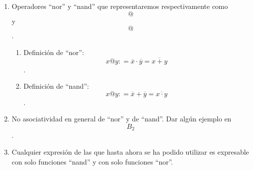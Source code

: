 \documentclass[
]{article}
\providecommand{\tightlist}{%
  \setlength{\itemsep}{0pt}\setlength{\parskip}{0pt}}
\begin{document}
\begin{enumerate}
\begin{enumerate}
\begin{enumerate}
\begin{enumerate}
\begin{enumerate}
          \emph{\textbf{a.5.HI.tts+tts*)}} La expresión sería una del
          tipo
          \[{T_{1} \cdot \mathit{TS}_{2}} = {T_{2} \cdot \mathit{TS}_{3}}\]
          ,
          \[{\left( {T_{1}{' + \mathit{TS}_{0}}} \right) + \mathit{TS}_{2}} = {\left( {T_{2}{' + \mathit{TS}_{1}}} \right) \cdot \mathit{TS}_{3}}\],
          dónde para \[T'\] suponemos (HI), que los valores de verdad de
          \[T_{1}{{' + \mathit{TS}_{2}} = T_{2}}{' + \mathit{TS}_{3}}\]
          son idénticos a los de
          \[\widetilde{T_{1}}{{' \cdot \widetilde{\mathit{TS}_{2}}} = \widetilde{T_{2}}}{' \cdot \widetilde{\mathit{TS}_{3}}}\]
          y viceversa. Ahora bien \[\mathit{TS}_{0} + \mathit{TS}_{2}\]
          podemos redu\-cirlo finalmente a un literal por evaluación,
          concretamente a una variable \[X\] o a una constante
          \[\Gamma\], e idénticamente para
          \[\mathit{TS}_{1} \cdot \mathit{TS}_{3}\].
          \[T_{2}{' \cdot \mathit{TS}_{3}}\]es lo mismo que una
          \[T_{3}\] cualquiera (de cualquier longitud). Así nos queda
          \[T_{1}{{' + L_{1}} = {T_{3} \cdot L_{2}}}\]que ya ha sido
          demostrado en \emph{a.5.tts+tts+)}. Así queda demostrado este
          caso.

          a.5.HI.t.neg) Cualquier T.p negado es susceptible de ser
          desarrollado (por las leyes de De Morgan) como un T.p y se
          aplica \emph{a.5.HI.*}.
        \item
          Casos en que la expresión \[E\]
          es\[T_{1} \neq T_{2}\]afirmativa:

          Estos casos se reduden a que alguna variable siempre es vacía
          tanto en la ex\-presión original como en la dual. Se reducen a
          los casos anteriores.
        \end{enumerate}
      \end{enumerate}
    \item
      Operadores ``nor'' y ``nand'' que representaremos respectivamente
      como \[@\]y \[@\].

      \begin{enumerate}
      \def\labelenumiv{\arabic{enumiv}.}
      \tightlist
      \item
        Definición de ``nor'':
        \[{x@y}{: =}{{\overline{x} \cdot \overline{y}} = \overline{x+y}}\].
      \item
        Definición de ``nand'':
        \[{x@y}{: =}{{\overline{x} + \overline{y}} = \overline{x\cdot y}}\].
      \end{enumerate}
    \item
      No asociatividad en general de ``nor'' y de ``nand''. Dar algún
      ejemplo en \[B_{2}\].
    \item
      Cualquier expresión de las que hasta ahora se ha podido utilizar
      es expresable con solo funciones ``nand'' y con solo funciones
      ``nor''.


\end{enumerate}
\end{enumerate}
\end{enumerate}
\end{document}
